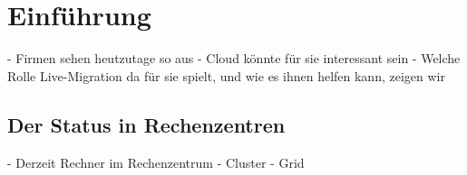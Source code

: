 \section{Einführung}
\label{sec:einfuehrung}



- Firmen sehen heutzutage so aus
- Cloud könnte für sie interessant sein
- Welche Rolle Live-Migration da für sie spielt, und wie es ihnen
helfen kann, zeigen wir

\subsection{Der Status in Rechenzentren}
- Derzeit Rechner im Rechenzentrum
- Cluster
- Grid

